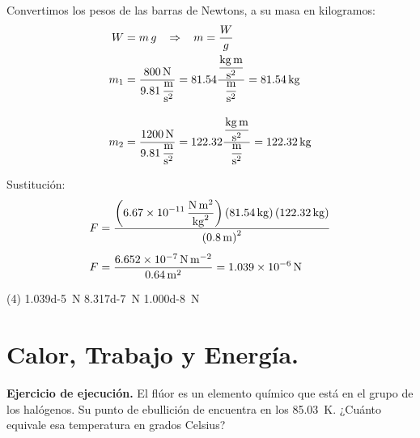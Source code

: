 \documentclass[12pt, letter]{exam}
\begin{document}
\begin{questions}
    Convertimos los pesos de las barras de Newtons, a su masa en kilogramos:
    \begin{align*}
    W &= m \, g \hspace{0.3cm} \Rightarrow \hspace{0.3cm} m = \dfrac{W}{g} \\
    m_{1} &= \dfrac{\SI{800}{\newton}}{\displaystyle \SI[per-mode=fraction]{9.81}{\meter\per\square\second}} = \num{81.54} \dfrac{\displaystyle \unit[per-mode=fraction]{\kilo\gram\meter\per\square\second}}{\displaystyle \unit[per-mode=fraction]{\meter\per\square\second}} = \SI{81.54}{\kilo\gram} \\[1em]
    m_{2} &= \dfrac{\SI{1200}{\newton}}{\displaystyle \SI[per-mode=fraction]{9.81}{\meter\per\square\second}} = \num{122.32} \dfrac{\displaystyle \unit[per-mode=fraction]{\kilo\gram\meter\per\square\second}}{\displaystyle \unit[per-mode=fraction]{\meter\per\square\second}} = \SI{122.32}{\kilo\gram}
    \end{align*}

    Sustitución:
    \begin{align*}
    F &= \dfrac{\left( \displaystyle \SI[per-mode=fraction]{6.67d-11}{\newton\square\meter\per\square\kilo\gram} \right) \left( \SI{81.54}{\kilo\gram} \right) \left( \SI{122.32}{\kilo\gram} \right)}{\left( \SI{0.8}{\meter} \right)^{2}} \\[0.5em]
    F &= \dfrac{\SI{6.652d-7}{\newton\per\square\meter}}{\SI{0.64}{\square\meter}} = \SI{1.039d-6}{\newton}
    \end{align*}
    
    \begin{tasks}(4)
        \task \SI{1.039d-5}{\newton}
        \task \SI{8.317d-7}{\newton}
        \task {}
        \task \SI{1.000d-8}{\newton}
    \end{tasks}

    \setcounter{section}{11}

    \section{Calor, Trabajo y Energía.}

    \setcounter{question}{33} \question  \textbf{Ejercicio de ejecución. } El flúor es un elemento químico que está en el grupo de los halógenos. Su punto de ebullición de encuentra en los \SI{85.03}{\kelvin}. ¿Cuánto equivale esa temperatura en grados Celsius?
    

\end{questions}
\end{document}
